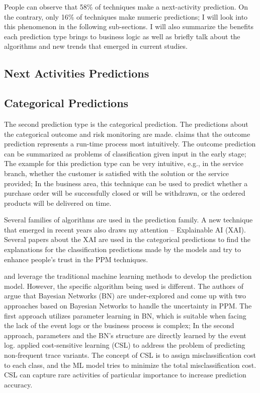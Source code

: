 \documentclass[runningheads]{llncs}
\begin{document}
		People can observe that 58\% of techniques make a next-activity prediction. On the contrary, only 16\% of techniques make numeric predictions; I will look into this phenomenon in the following sub-sections. I will also summarize the benefits each prediction type brings to business logic as well as briefly talk about the algorithms and new trends that emerged in current studies.
		
		\subsection{Next Activities Predictions}
		
		\subsection{Categorical Predictions}
		The second prediction type is the categorical prediction. The predictions about the categorical outcome and risk monitoring are made. \cite{art-9} claims that the outcome prediction represents a run-time process most intuitively. The outcome prediction can be summarized as problems of classification given input in the early stage; The example for this prediction type can be very intuitive, e.g., in the service branch, whether the customer is satisfied with the solution or the service provided; In the business area, this technique can be used to predict whether a purchase order will be successfully closed or will be withdrawn, or the ordered products will be delivered on time\cite{art-12}.
		
		Several families of algorithms are used in the prediction family. A new technique that emerged in recent years also draws my attention -- Explainable AI (XAI). Several papers about the XAI are used in the categorical predictions to find the explanations for the classification predictions made by the models and try to enhance people's trust in the PPM techniques. 
		
		\cite{art-4} and \cite{art-26} leverage the traditional machine learning methods to develop the prediction model. However, the specific algorithm being used is different. The authors of \cite{art-4} argue that Bayesian Networks (BN) are under-explored and come up with two approaches based on Bayesian Networks to handle the uncertainty in PPM. The first approach utilizes parameter learning in BN, which is suitable when facing the lack of the event logs or the business process is complex; In the second approach, parameters and the BN's structure are directly learned by the event log. \cite{art-26} applied cost-sensitive learning (CSL) to address the problem of predicting non-frequent trace variants. The concept of CSL is to assign misclassification cost to each class, and the ML model tries to minimize the total misclassification cost. CSL can capture rare activities of particular importance to increase prediction accuracy. \cite{art-8}  
		
\end{document}
